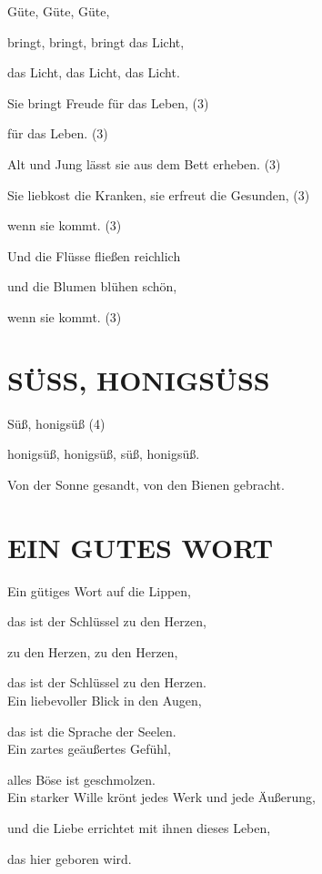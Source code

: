 \documentclass[11pt,a5paper,twoside]{article}
\begin{document}
Güte, Güte, Güte,

bringt, bringt, bringt das Licht,

das Licht, das Licht, das Licht. 

Sie bringt Freude für das Leben, (3)

für das Leben. (3)

Alt und Jung lässt sie aus dem Bett erheben. (3)

Sie liebkost die Kranken, sie erfreut die Gesunden, (3)

wenn sie kommt. (3) 

Und die Flüsse fließen reichlich 

und die Blumen blühen schön,

wenn sie kommt. (3)



 


\section[Süß, honigsüß]{SÜSS, HONIGSÜSS}

Süß, honigsüß (4)

honigsüß, honigsüß, süß, honigsüß.

Von der Sonne gesandt, von den Bienen gebracht. \\



\section[Ein gütiges Wort]{EIN GUTES WORT}

Ein gütiges Wort auf die Lippen, 

das ist der Schlüssel zu den Herzen,

zu den Herzen, zu den Herzen,

das ist der Schlüssel zu den Herzen.\\


Ein liebevoller Blick in den Augen,

das ist die Sprache der Seelen.\\

Ein zartes geäußertes Gefühl, 

alles Böse ist geschmolzen.\\


Ein starker Wille krönt jedes Werk und jede Äußerung,

und die Liebe errichtet mit ihnen dieses Leben, 

das hier geboren wird.
\end{document}
